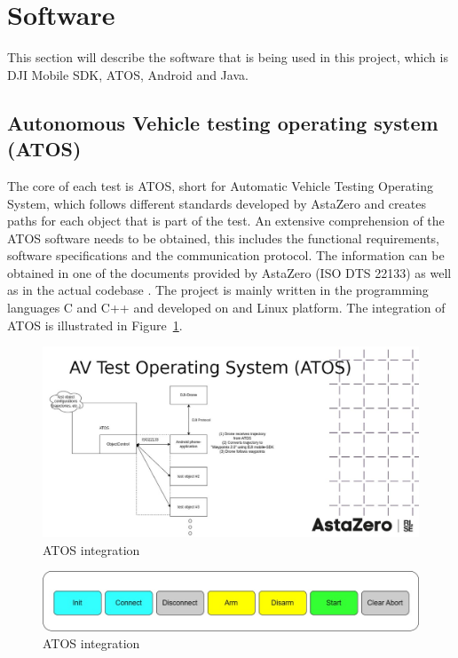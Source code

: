 \section{Software}
This section will describe the software that is being used in this project, which is DJI Mobile SDK, ATOS, Android and Java.




\subsection{Autonomous Vehicle testing operating system (ATOS)}
The core of each test is ATOS, short for Automatic Vehicle Testing Operating System, which follows different standards developed by AstaZero and creates paths for each object that is part of the test. An extensive comprehension of the ATOS software needs to be obtained, this includes the functional requirements, software specifications and the communication protocol. The information can be obtained in one of the documents provided by AstaZero (ISO DTS 22133) as well as in the actual codebase . The project is mainly written in the programming languages C and C++ and developed on and Linux platform. The integration of ATOS is illustrated in Figure~\ref{fig:ATOS}.


\begin{figure}[H]
  \centering
  \includegraphics[width=\columnwidth]{figure/atos.jpg}
  \caption{ATOS integration}
  \label{fig:ATOS}
\end{figure}

\begin{figure}[H]
  \centering
  \includegraphics[width=\columnwidth]{figure/ATOS (4).jpg}
  \caption{ATOS integration}
  \label{fig:ATOS2}
\end{figure}

